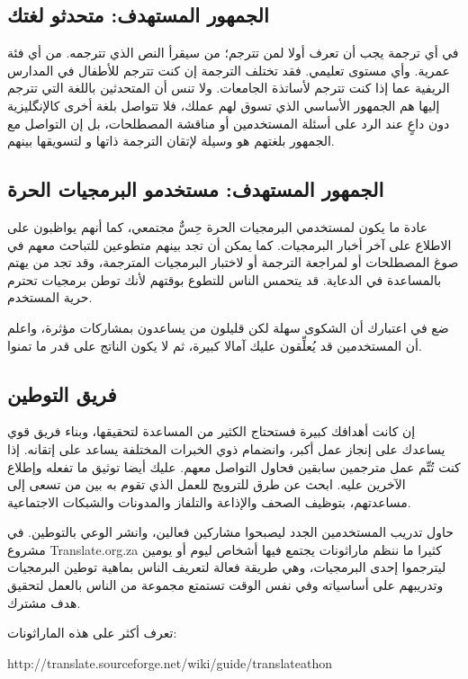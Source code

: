 \subsection{الجمهور المستهدف: متحدثو لغتك}
في أي ترجمة يجب أن تعرف أولا لمن تترجم؛ من سيقرأ النص الذي تترجمه. من أي
فئة عمرية. وأي مستوى تعليمي. فقد تختلف الترجمة إن كنت تترجم للأطفال في
المدارس الريفية عما إذا كنت تترجم لأساتذة الجامعات. ولا تنس أن
المتحدثين باللغة التي تترجم إليها هم الجمهور الأساسي الذي تسوق لهم
عملك، فلا تتواصل بلغة أخرى كالإنگليزية دون داعٍ عند الرد على أسئلة
المستخدمين أو مناقشة المصطلحات، بل إن التواصل مع الجمهور بلغتهم هو
وسيلة لإتقان الترجمة ذاتها و لتسويقها بينهم.

\subsection{الجمهور المستهدف: مستخدمو البرمجيات الحرة}
عادة ما يكون لمستخدمي البرمجيات الحرة حِسٌّ مجتمعي، كما أنهم يواظبون على
الاطلاع على آخر أخبار البرمجيات. كما يمكن أن تجد بينهم متطوعين للتباحث
معهم في صوغ المصطلحات أو لمراجعة الترجمة أو لاختبار البرمجيات المترجمة،
وقد تجد من يهتم بالمساعدة في الدعاية. قد يتحمس الناس للتطوع بوقتهم لأنك
توطن برمجيات تحترم حرية المستخدم.

ضع في اعتبارك أن الشكوى سهلة لكن قليلون من يساعدون بمشاركات مؤثرة، واعلم
أن المستخدمين قد يُعلِّقون عليك آمالا كبيرة، ثم لا يكون الناتج على قدر
ما تمنوا.

\subsection{فريق التوطين}
إن كانت أهدافك كبيرة فستحتاج الكثير من المساعدة لتحقيقها، وبناء فريق قوي
يساعدك على إنجاز عمل أكبر، وانضمام ذوي الخبرات المختلفة يساعد على
إتقانه. إذا كنت تُتِّم عمل مترجمين سابقين فحاول التواصل معهم. عليك أيضا
توثيق ما تفعله وإطلاع الآخرين عليه. ابحث عن طرق للترويج للعمل الذي تقوم
به بين من تسعى إلى مساعدتهم، بتوظيف الصحف والإذاعة والتلفاز والمدونات
والشبكات الاجتماعية.

حاول تدريب المستخدمين الجدد ليصبحوا مشاركين فعالين، وانشر الوعي
بالتوطين. في مشروع Translate.org.za كثيرا ما ننظم ماراثونات يجتمع فيها
أشخاص ليوم أو يومين ليترجموا إحدى البرمجيات، وهي طريقة فعالة لتعريف
الناس بماهية توطين البرمجيات وتدريبهم على أساسياته وفي نفس الوقت تستمتع
مجموعة من الناس بالعمل لتحقيق هدف مشترك.

تعرف أكثر على هذه الماراثونات:

http://translate.sourceforge.net/wiki/guide/translateathon

